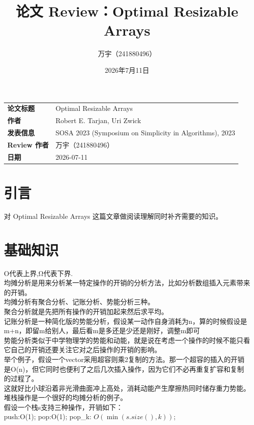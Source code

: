 \documentclass[12pt,a4paper]{article}
\title{\textbf{论文 Review：Optimal Resizable Arrays}}
\author{万宇（241880496）}
\date{2026年7月11日}
\begin{document}
\maketitle

\begin{center}
\begin{tabular}{ll}
\textbf{论文标题} & Optimal Resizable Arrays \\
\textbf{作者}     & Robert E. Tarjan, Uri Zwick \\
\textbf{发表信息} & SOSA 2023 (Symposium on Simplicity in Algorithms), 2023 \\
\textbf{Review 作者} & 万宇（241880496） \\
\textbf{日期}     & 2026-07-11 \\
\end{tabular}
\end{center}

\tableofcontents
\newpage

\section{引言}

对 Optimal Resizable Arrays 这篇文章做阅读理解同时补齐需要的知识。


\section{基础知识}
O代表上界,Ω代表下界.\\
均摊分析是用来分析某一特定操作的开销的分析方法，比如分析数组插入元素带来的开销。\\
均摊分析有聚合分析、记账分析、势能分析三种。\\
聚合分析就是先把所有操作的开销加起来然后求平均。\\
记账分析是一种简化版的势能分析，假设某一动作自身消耗为n，算的时候假设是m+n，即留m给别人，最后看m是多还是少还是刚好，调整m即可\\
势能分析类似于中学物理学的势能和动能，就是说在考虑一个操作的时候不能只看它自己的开销还要关注它对之后操作的开销的影响。\\
举个例子，假设一个vector采用超容则乘2复制的方法。那一个超容的插入的开销是O(n)，但它同时也便利了之后几次插入操作，因为它们不必再重复扩容和复制的过程了。\\
这就好比小球沿着非光滑曲面冲上高处，消耗动能产生摩擦热同时储存重力势能。\\
堆栈操作是一个很好的均摊分析的例子。\\
假设一个栈s支持三种操作，开销如下：\\
push:O(1);
pop:O(1);
pop\_k: $O(\min(s.size(),k))$;
\end{document}
